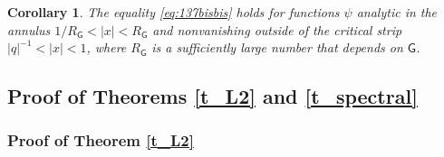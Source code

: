 \documentclass[14pt]{extarticle}
\newcommand{\bG}{\mathsf{G}}
\newcommand{\bC}{\mathsf{C}}
\newcommand{\cT}{\mathscr{T}}
\newcommand{\fn}{\mathfrak{n}}
\newcommand{\fb}{\mathfrak{b}}
\newcommand{\Omd}{{\Omega}^{\raisebox{0.5mm}{$\scriptscriptstyle \bullet$}}}
\newcommand{\comp}{\textup{cmp}}
\newtheorem{Proposition}[Lemma]{Proposition}
\newtheorem{Corollary}[Lemma]{Corollary}
\theoremstyle{definition}
\begin{document}








\begin{Corollary}\label{c_crit} 
The equality \eqref{eq:137bisbis} holds for functions $\psi$ analytic 
in the annulus $1/R_\bG < |x| < R_\bG$ and nonvanishing outside
of the critical strip $|q|^{-1} < | x |< 1$, where $R_\bG$ is a
sufficiently large number that depends on $\bG$. 
\end{Corollary}




\subsection{Proof of Theorems  \ref{t_L2} and \ref{t_spectral}}
\label{s_proof} 

\subsubsection{Proof of Theorem \ref{t_L2}}
\end{document}
